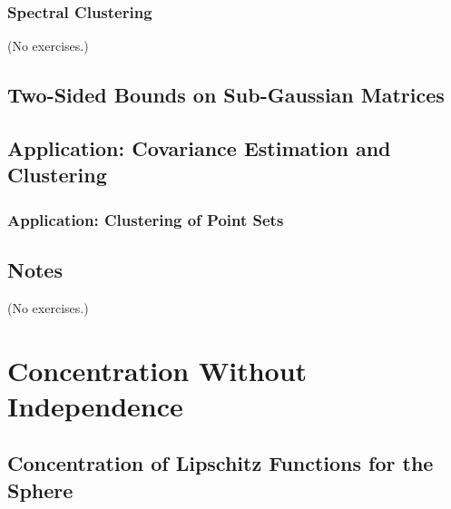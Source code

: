\documentclass{report}
\theoremstyle{definition}
\newenvironment{exercise}[1]{
  \renewcommand\theexerciseimpl{#1}
  \exerciseimpl
}{\endexerciseimpl}
\begin{document}
\subsection{Spectral Clustering}

(No exercises.)

\section{Two-Sided Bounds on Sub-Gaussian Matrices}

\begin{exercise}{4.6.2}
\end{exercise}

\begin{exercise}{4.6.3}
\end{exercise}

\begin{exercise}{4.6.4}
\end{exercise}

\section{Application: Covariance Estimation and Clustering}

\begin{exercise}{4.7.1}
\end{exercise}

\subsection{Application: Clustering of Point Sets}

\begin{exercise}{4.7.6}
\end{exercise}

\section{Notes}

(No exercises.)


\chapter{Concentration Without Independence}

\section{Concentration of Lipschitz Functions for the Sphere}
\end{document}
